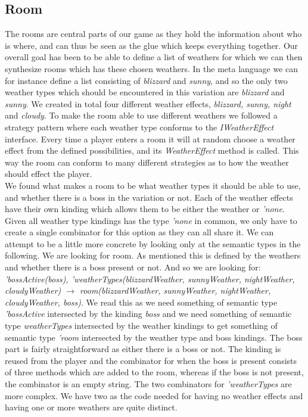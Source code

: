 \subsection{Room}\label{Room}
The rooms are central parts of our game as they hold the information about who is where, and can thus be seen as the glue which keeps everything together. Our overall goal has been to be able to define a list of weathers for which we can then synthesize rooms which has these chosen weathers. In the meta language we can for instance define a list consisting of \textit{blizzard} and \textit{sunny}, and so the only two weather types which should be encountered in this variation are \textit{blizzard} and \textit{sunny}. We created in total four different weather effects, \textit{blizzard, sunny, night} and \textit{cloudy}. To make the room able to use different weathers we followed a strategy pattern where each weather type conforms to the \textit{IWeatherEffect} interface. Every time a player enters a room it will at random choose a weather effect from the defined possibilities, and its \textit{WeatherEffect} method is called. This way the room can conform to many different strategies as to how the weather should effect the player. \\
We found what makes a room to be what weather types it should be able to use, and whether there is a boss in the variation or not. Each of the weather effects have their own kinding which allows them to be either the weather or \textit{'none}. Given all weather type kindings has the type \textit{'none} in common, we only have to create a single combinator for this option as they can all share it. We can attempt to be a little more concrete by looking only at the semantic types in the following. We are looking for room. As mentioned this is defined by the weathers and whether there is a boss present or not. And so we are looking for: \textit{'bossActive(boss), 'weatherTypes(blizzardWeather, sunnyWeather, nightWeather, cloudyWeather) $\to$ room(blizzardWeather, sunnyWeather, nightWeather, cloudyWeather, boss)}. We read this as we need something of semantic type \textit{'bossActive} intersected by the kinding \textit{boss} and we need something of semantic type \textit{weatherTypes} intersected by the weather kindings to get something of semantic type \textit{'room} intersected by the weather type and boss kindings. The boss part is fairly straightforward as either there is a boss or not. The kinding is reused from the player and the combinator for when the boss is present consists of three methods which are added to the room, whereas if the boss is not present, the combinator is an empty string. The two combinators for \textit{'weatherTypes} are more complex. We have two as the code needed for having no weather effects and having one or more weathers are quite distinct.

